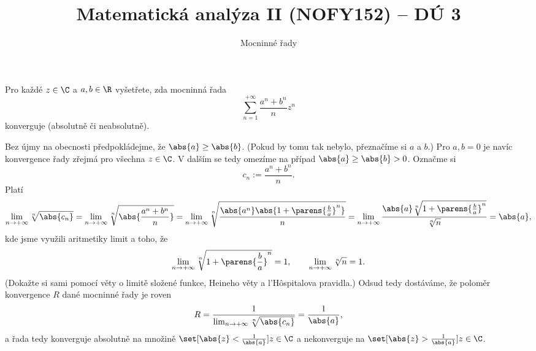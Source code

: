 \documentclass[answers]{exam}
\title{\vspace{-3ex}Matematická analýza II (NOFY152) – DÚ 3}
\author{Mocninné řady}
\date{\vspace{-5ex}}
\begin{document}
\maketitle

\begin{questions}	
  \question Pro každé $z \in \C$ a $a, b \in \R$ vyšetřete, zda mocninná řada
  \begin{equation*}
    \sum_{n = 1}^{+\infty}
    \frac{a^n + b^n}{n}z^n
  \end{equation*}
  konverguje (absolutně či neabsolutně).
    
  \begin{solution}
  	Bez újmy na obecnosti předpokládejme, že $\abs{a} \ge \abs{b}$. (Pokud by tomu tak nebylo, přeznačíme si $a$ a $b$.) Pro $a, b = 0$ je navíc konvergence řady zřejmá pro všechna $z \in \C$. V dalším se tedy omezíme na případ $\abs{a} \ge \abs{b} > 0$. Označme si
  	\begin{equation*}
  		c_n
  		:=
  		\frac{a^n + b^n}{n}.
  	\end{equation*}
  	Platí
  	\begin{equation*}
  		\lim_{n\to+\infty}
  		\sqrt[n]{\abs{c_n}}
  		=
  		\lim_{n\to+\infty}
  		\sqrt[n]{\abs{\frac{a^n + b^n}{n}}}
  		=
  		\lim_{n \to +\infty}
  		\sqrt[n]{\frac{\abs{a^n} \abs{1 + \parens{\frac{b}{a}}^n}}{n}}
  		=
  		\lim_{n \to +\infty}
  		\frac{\abs{a} \sqrt[n]{1 + \parens{\frac{b}{a}}^n}}{\sqrt[n]{n}}
  		=
  		\abs{a},
  	\end{equation*}
  	kde jsme využili aritmetiky limit a toho, že
  	\begin{equation*}
  		\lim_{n \to +\infty}
  		\sqrt[n]{1 + \parens{\frac{b}{a}}^n}
  		=
  		1,
  		\qquad
  		\lim_{n \to +\infty}
  		\sqrt[n]{n}
  		=
  		1.
  	\end{equation*}
  	(Dokažte si sami pomocí věty o limitě složené funkce, Heineho věty a l'H\^{o}spitalova pravidla.) Odsud tedy dostáváme, že poloměr konvergence $R$ dané mocninné řady je roven
  	\begin{equation*}
  		R = \frac{1}{\lim_{n \to +\infty} \sqrt[n]{\abs{c_n}}} = \frac{1}{\abs{a}},
  	\end{equation*}
  	a řada tedy konverguje absolutně na množině $\set[\abs{z} < \frac{1}{\abs{a}}]{z \in \C}$ a nekonverguje na $\set[\abs{z} > \frac{1}{\abs{a}}]{z \in \C}$.
  	

\end{solution}
\end{questions}
\end{document}
